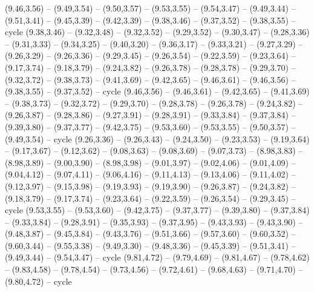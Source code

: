 \expandafter\def\csname geo:gebiet:VUT\endcsname{
  }
\expandafter\def\csname geo:gebiet:KHM\endcsname{
  (9.46,3.56) -- (9.49,3.54) -- (9.50,3.57) -- (9.53,3.55) -- (9.54,3.47) -- (9.49,3.44) -- (9.51,3.41) -- (9.45,3.39) -- (9.42,3.39) -- (9.38,3.46) -- (9.37,3.52) -- (9.38,3.55) -- cycle}
\expandafter\def\csname geo:gebiet:THA\endcsname{
  (9.38,3.46) -- (9.32,3.48) -- (9.32,3.52) -- (9.29,3.52) -- (9.30,3.47) -- (9.28,3.36) -- (9.31,3.33) -- (9.34,3.25) -- (9.40,3.20) -- (9.36,3.17) -- (9.33,3.21) -- (9.27,3.29) -- (9.26,3.29) -- (9.26,3.36) -- (9.29,3.45) -- (9.26,3.54) -- (9.22,3.59) -- (9.23,3.64) -- (9.17,3.74) -- (9.18,3.79) -- (9.24,3.82) -- (9.26,3.78) -- (9.28,3.78) -- (9.29,3.70) -- (9.32,3.72) -- (9.38,3.73) -- (9.41,3.69) -- (9.42,3.65) -- (9.46,3.61) -- (9.46,3.56) -- (9.38,3.55) -- (9.37,3.52) -- cycle}
\expandafter\def\csname geo:gebiet:LAO\endcsname{
  (9.46,3.56) -- (9.46,3.61) -- (9.42,3.65) -- (9.41,3.69) -- (9.38,3.73) -- (9.32,3.72) -- (9.29,3.70) -- (9.28,3.78) -- (9.26,3.78) -- (9.24,3.82) -- (9.26,3.87) -- (9.28,3.86) -- (9.27,3.91) -- (9.28,3.91) -- (9.33,3.84) -- (9.37,3.84) -- (9.39,3.80) -- (9.37,3.77) -- (9.42,3.75) -- (9.53,3.60) -- (9.53,3.55) -- (9.50,3.57) -- (9.49,3.54) -- cycle}
\expandafter\def\csname geo:gebiet:MMR\endcsname{
  (9.26,3.36) -- (9.26,3.43) -- (9.24,3.50) -- (9.23,3.53) -- (9.19,3.64) -- (9.17,3.67) -- (9.12,3.62) -- (9.08,3.63) -- (9.08,3.69) -- (9.07,3.73) -- (8.98,3.83) -- (8.98,3.89) -- (9.00,3.90) -- (8.98,3.98) -- (9.01,3.97) -- (9.02,4.06) -- (9.01,4.09) -- (9.04,4.12) -- (9.07,4.11) -- (9.06,4.16) -- (9.11,4.13) -- (9.13,4.06) -- (9.11,4.02) -- (9.12,3.97) -- (9.15,3.98) -- (9.19,3.93) -- (9.19,3.90) -- (9.26,3.87) -- (9.24,3.82) -- (9.18,3.79) -- (9.17,3.74) -- (9.23,3.64) -- (9.22,3.59) -- (9.26,3.54) -- (9.29,3.45) -- cycle}
\expandafter\def\csname geo:gebiet:VNM\endcsname{
  (9.53,3.55) -- (9.53,3.60) -- (9.42,3.75) -- (9.37,3.77) -- (9.39,3.80) -- (9.37,3.84) -- (9.33,3.84) -- (9.28,3.91) -- (9.35,3.93) -- (9.37,3.95) -- (9.43,3.93) -- (9.43,3.90) -- (9.48,3.87) -- (9.45,3.84) -- (9.43,3.76) -- (9.51,3.66) -- (9.57,3.60) -- (9.60,3.52) -- (9.60,3.44) -- (9.55,3.38) -- (9.49,3.30) -- (9.48,3.36) -- (9.45,3.39) -- (9.51,3.41) -- (9.49,3.44) -- (9.54,3.47) -- cycle}
\expandafter\def\csname geo:gebiet:PRK\endcsname{
  (9.81,4.72) -- (9.79,4.69) -- (9.81,4.67) -- (9.78,4.62) -- (9.83,4.58) -- (9.78,4.54) -- (9.73,4.56) -- (9.72,4.61) -- (9.68,4.63) -- (9.71,4.70) -- (9.80,4.72) -- cycle}
